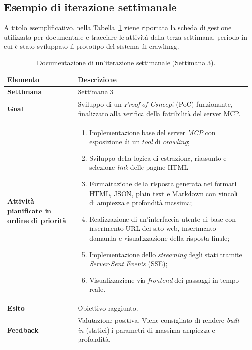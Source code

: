 \subsection{Esempio di iterazione settimanale}
A titolo esemplificativo, nella Tabella~\ref{tab:esempio-iterazione} viene riportata la scheda di gestione utilizzata per documentare e tracciare le attività della terza settimana, periodo in cui è stato sviluppato il prototipo del sistema di \gls{crawlingg}.
\begin{table}[htbp]
    \centering
    \small
    \renewcommand{\arraystretch}{1.4}
    \begin{tabular}{|p{3cm}|p{10cm}|}
        \hline
        \textbf{Elemento} & \textbf{Descrizione} \\ \hline

        \textbf{Settimana} & Settimana 3 \\ \hline

        \textbf{Goal} & Sviluppo di un \textit{Proof of Concept} (PoC) funzionante, finalizzato alla verifica della fattibilità del server MCP. \\ \hline

        \textbf{Attività pianificate in ordine di priorità} &
        \begin{enumerate}
            \item Implementazione base del server \textit{MCP} con esposizione di un \textit{tool} di \textit{crawling};
            \item Sviluppo della logica di estrazione, riassunto e selezione \textit{link} delle pagine HTML;
            \item Formattazione della risposta generata nei formati HTML, JSON, plain text e Markdown con vincoli di ampiezza e profondità massima;
            \item Realizzazione di un’interfaccia utente di base con inserimento URL dei sito web, inserimento domanda e visualizzazione della risposta finale;
            \item Implementazione dello \textit{streaming} degli stati tramite \textit{Server-Sent Events} (SSE);
            \item Visualizzazione via \textit{frontend} dei passaggi in tempo reale.
        \end{enumerate}
        \\ \hline

        \textbf{Esito} &
        Obiettivo raggiunto. \\ \hline

        \textbf{Feedback} &
        Valutazione positiva. Viene consigliato di rendere \textit{built-in} (statici) i parametri di massima ampiezza e profondità. \\ \hline

    \end{tabular}
    \caption{Documentazione di un’iterazione settimanale (Settimana 3).}
    \label{tab:esempio-iterazione}
\end{table}


